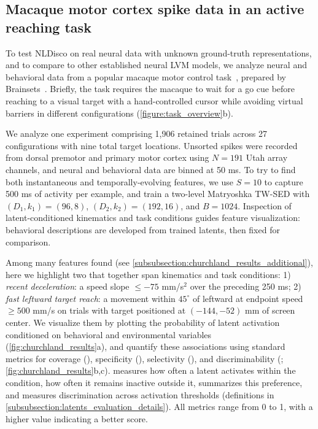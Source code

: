 \subsection{Macaque motor cortex spike data in an active reaching task}
\label{subsection:churchland_results}


To test NLDisco on real neural data with unknown ground-truth representations, and to compare to other established neural LVM models, we analyze neural and behavioral data from a popular macaque motor control task~\citep{churchland_2012_population_dynamics}, prepared by Brainsets~\citep{azabou_2023_unified}. Briefly, the task requires the macaque to wait for a go cue before reaching to a visual target with a hand-controlled cursor while avoiding virtual barriers in different configurations (\autoref{figure:task_overview}b).

We analyze one experiment comprising 1,906 retained trials across 27 configurations with nine total target locations. Unsorted spikes were recorded from dorsal premotor and primary motor cortex using $N=191$ Utah array channels, and neural and behavioral data are binned at 50 ms. To try to find both instantaneous and temporally-evolving features, we use $S=10$ to capture 500 ms of activity per example, and train a two-level Matryoshka TW-SED with $(D_1,k_1)=(96,8)$, $(D_2,k_2)=(192,16)$, and $B=1024$. Inspection of latent-conditioned kinematics and task conditions guides feature visualization: behavioral descriptions are developed from trained latents, then fixed for comparison.

Among many features found (see \hyperref[subsubsection:churchland_results_additional]{\ref*{subsubsection:churchland_results_additional}}), here we highlight two that together span kinematics and task conditions: 1) \textit{recent deceleration}: a speed slope $\leq-75$ mm/s$^2$ over the preceding 250 ms; 2) \textit{fast leftward target reach}: a movement within $45^\circ$ of leftward at endpoint speed $\geq500$ mm/s on trials with target positioned at $(-144,-52)$ mm of screen center. We visualize them by plotting the probability of latent activation conditioned on behavioral and environmental variables (\autoref{fig:churchland_results}a), and quantify these associations using standard metrics for coverage (), specificity (), selectivity (), and discriminability (; \autoref{fig:churchland_results}b,c).  measures how often a latent activates within the condition,  how often it remains inactive outside it,  summarizes this preference, and  measures discrimination across activation thresholds (definitions in \hyperref[subsubsection:latents_evaluation_details]{\ref*{subsubsection:latents_evaluation_details}}). All metrics range from 0 to 1, with a higher value indicating a better score.

